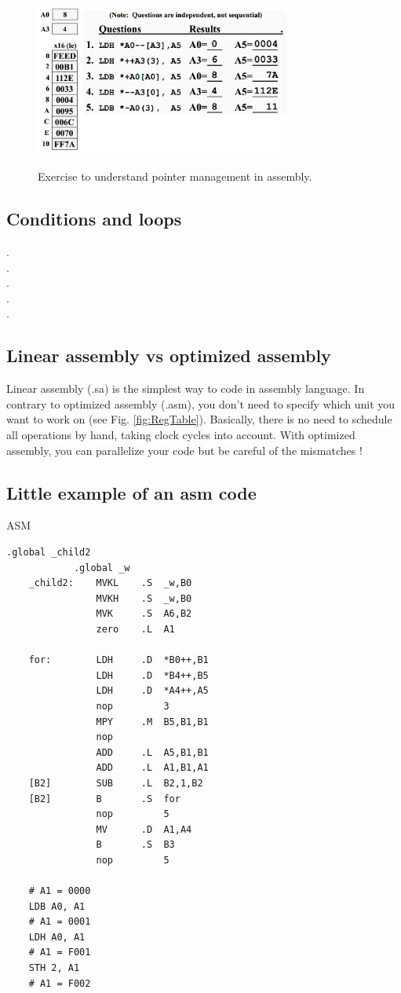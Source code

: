 \documentclass[runningheads,a4paper]{llncs}
\begin{document}
	\begin{figure}
		\centering
		\includegraphics[width=0.75\textwidth]{Figures/examplePointer}
		\\ \parbox{0.75\textwidth}{\caption[examplePointer]{Exercise to understand pointer management in assembly. }\label{fig:examplePointer}} 
	\end{figure}

	\subsection{Conditions and loops}
	.\\.\\.\\.\\.\\
	
	\subsection{Linear assembly vs optimized assembly}
	
	Linear assembly (.sa) is the simplest way to code in assembly language. In contrary to optimized assembly (.asm), you don't need to specify which unit you want to work on (see Fig. \ref{fig:RegTable}). Basically, there is no need to schedule all operations by hand, taking clock cycles into account. With optimized assembly, you can parallelize your code but be careful of the mismatches !
	
	\subsection{Little example of an asm code}
	
	ASM
	
	\begin{lstlisting}[language={[x86masm]Assembler}]
			.global _child2
			.global _w
	_child2: 	MVKL	.S	_w,B0
				MVKH	.S	_w,B0
				MVK		.S	A6,B2
				zero	.L	A1
				
	for:		LDH		.D	*B0++,B1
				LDH		.D	*B4++,B5
				LDH		.D	*A4++,A5
				nop			3
				MPY		.M	B5,B1,B1
				nop
				ADD		.L	A5,B1,B1
				ADD		.L	A1,B1,A1
	[B2]		SUB		.L	B2,1,B2
	[B2]		B		.S	for
				nop			5
				MV		.D	A1,A4
				B		.S	B3
				nop			5			
	
	# A1 = 0000
	LDB A0, A1
	# A1 = 0001
	LDH A0, A1
	# A1 = F001
	STH 2, A1
	# A1 = F002
	\end{lstlisting}
	
\end{document}
